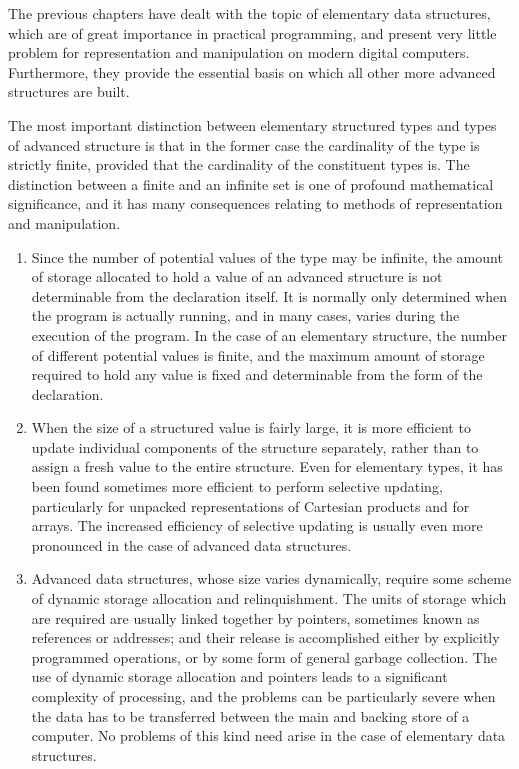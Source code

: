 The previous chapters have dealt with the topic of elementary data structures, which are of great importance in practical programming,  and present very little problem for representation and manipulation on modern digital computers. Furthermore, they provide the essential basis on which all other more advanced structures are built.

The most important distinction between elementary structured types and types of advanced structure is that in the former case the cardinality of the type is strictly finite, provided that the cardinality of the constituent types is. The distinction between a finite and an infinite set is one of profound mathematical significance, and it has many consequences relating to methods of representation and manipulation.

\begin{enumerate}[leftmargin=2\parindent, label=(\arabic*)]
	\item Since the number of potential values of the type may be infinite, the amount of storage allocated to hold a value of an advanced structure is not determinable from the declaration itself. It is normally only determined when the program is actually running, and in many cases, varies during the execution of the program. In the case of an elementary structure, the number of different potential values is finite, and the maximum amount of storage required to hold any value is fixed and determinable from the form of the declaration.

	\item When the size of a structured value is fairly large, it is more efficient to update individual components of the structure separately, rather than to assign a fresh value to the entire structure. Even for elementary types, it has been found sometimes more efficient to perform selective updating, particularly for unpacked representations of Cartesian products and for arrays. The increased efficiency of selective updating is usually even more pronounced in the case of advanced data structures.

	\item Advanced data structures, whose size varies dynamically, require some scheme of dynamic storage allocation and relinquishment. The units of storage which are required are usually linked together by pointers, sometimes known as references or addresses; and their release is accomplished either by explicitly programmed operations, or by some form of general garbage collection. The use of dynamic storage allocation and pointers leads to a significant complexity of processing, and the problems can be particularly severe when the data has to be transferred between the main and backing store of a computer. No problems of this kind need arise in the case of elementary data structures.


\end{enumerate}
